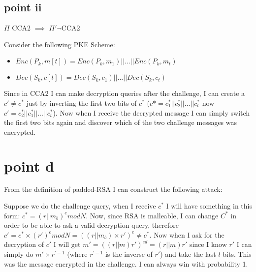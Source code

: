 \newpage
\subsection{point ii}

$\Pi$ CCA2 $\implies$ $\Pi' \neg$CCA2

Consider the following PKE Scheme:
\begin{itemize}
    \item $Enc(P_k,m[t])=Enc(P_k,m_1)||...||Enc(P_k,m_t)$
    \item $Dec(S_k,c[t])=Dec(S_k,c_1)||...||Dec(S_k,c_t)$
\end{itemize}
Since in CCA2 I can make decryption queries after the challenge, I can create a $c'\neq c^*$ just by inverting the first two bits of $c^*$ ($c*=c_1^*||c_2^*||...||c^*_t$ now $c'=c_2^*||c_1^*||...||c^*_t$). Now when I receive the decrypted message I can simply switch the first two bits again and discover which of the two challenge messages was encrypted.

\section{point d}

From the definition of padded-RSA I can construct the following attack:

Suppose we do the challenge query, when I receive $c^*$ I will have something in this form: $c^*=(r||m_b)^e mod N$. Now, since RSA is malleable, I can change $C^*$ in order to be able to ask a valid decryption query, therefore $c'=c^*\times(r')^e mod N= ((r||m_b) \times r')^e\neq c^*$. Now when I ask for the decryption of $c'$ I will get $m'=((r||m)r')^{ed}=(r||m)r'$ since I know $r'$ I can simply do $m'\times r^{\prime -1}$ (where $r^{\prime -1}$ is the inverse of $r'$) and take the last $l$ bits. This was the message encrypted in the challenge.  I can always win with probability 1.
